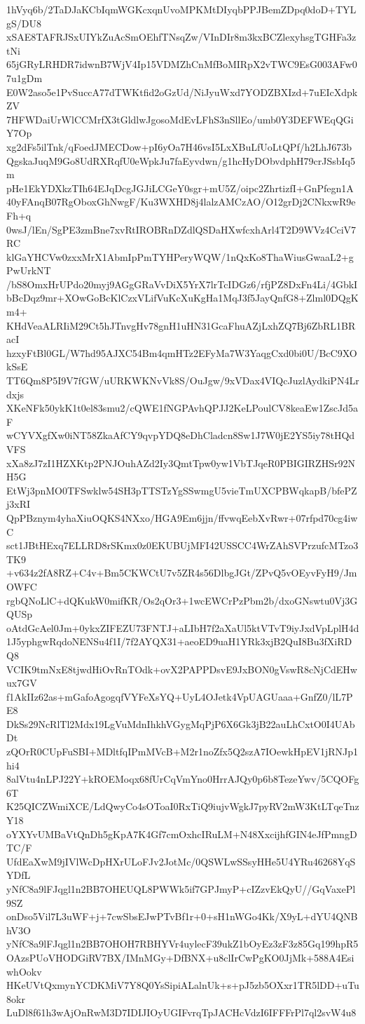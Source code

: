1hVyq6b/2TaDJaKCbIqmWGKcxqnUvoMPKMtDIyqbPPJBemZDpq0doD+TYLgS/DU8
xSAE8TAFRJSxUIYkZuAcSmOEhfTNsqZw/VInDIr8m3kxBCZlexyhsgTGHFa3ztNi
65jGRyLRHDR7idwnB7WjV4Ip15VDMZhCnMfBoMIRpX2vTWC9EsG003AFw07u1gDm
E0W2aso5e1PvSuccA77dTWKtfid2oGzUd/NiJyuWxd7YODZBXIzd+7uEIcXdpkZV
7HFWDaiUrWlCCMrfX3tGldlwJgosoMdEvLFhS3nSllEo/umb0Y3DEFWEqQGiY7Op
xg2dFs5ilTnk/qFoedJMECDow+pI6yOa7H46vsI5LxXBuLfUoLtQPf/h2LhJ673b
QgskaJuqM9Go8UdRXRqfU0eWpkJu7faEyvdwn/g1hcHyDObvdphH79crJSsbIq5m
pHe1EkYDXkzTIh64EJqDcgJGJiLCGeY0sgr+mU5Z/oipc2ZhrtizfI+GnPfegn1A
40yFAnqB07RgOboxGhNwgF/Ku3WXHD8j4lalzAMCzAO/O12grDj2CNkxwR9eFh+q
0wsJ/lEn/SgPE3zmBne7xvRtIROBRnDZdlQSDaHXwfcxhArl4T2D9WVz4CciV7RC
klGaYHCVw0zxxMrX1AbmIpPmTYHPeryWQW/1nQxKo8ThaWiusGwaaL2+gPwUrkNT
/bS8OmxHrUPdo20myj9AGgGRaVvDiX5YrX7lrTcIDGz6/rfjPZ8DxFn4Li/4GbkI
bBcDqz9mr+XOwGoBcKlCzxVLifVuKcXuKgHa1MqJ3f5JayQnfG8+Zlml0DQgKm4+
KHdVeaALRIiM29Ct5hJTnvgHv78gnH1uHN31GcaFhuAZjLxhZQ7Bj6ZbRL1BRacI
hzxyFtBl0GL/W7hd95AJXC54Bm4qmHTz2EFyMa7W3YaqgCxd0bi0U/BcC9XOkSsE
TT6Qm8P5I9V7fGW/uURKWKNvVk8S/OuJgw/9xVDax4VIQcJuzlAydkiPN4Lrdxjs
XKeNFk50ykK1t0el83smu2/cQWE1fNGPAvhQPJJ2KeLPoulCV8keaEw1ZscJd5aF
wCYVXgfXw0iNT58ZkaAfCY9qvpYDQ8eDhCladcn8Sw1J7W0jE2YS5iy78tHQdVFS
xXa8zJ7zI1HZXKtp2PNJOuhAZd2Iy3QmtTpw0yw1VbTJqeR0PBIGIRZHSr92NH5G
EtWj3pnMO0TFSwklw54SH3pTTSTzYgSSwmgU5vieTmUXCPBWqkapB/bfePZj3xRI
QpPBznym4yhaXiuOQKS4NXxo/HGA9Em6jjn/ffvwqEebXvRwr+07rfpd70cg4iwC
sct1JBtHExq7ELLRD8rSKmx0z0EKUBUjMFI42USSCC4WrZAhSVPrzufcMTzo3TK9
+v634z2fA8RZ+C4v+Bm5CKWCtU7v5ZR4s56DlbgJGt/ZPvQ5vOEyvFyH9/JmOWFC
rgbQNoLlC+dQKukW0mifKR/Os2qOr3+1wcEWCrPzPbm2b/dxoGNswtu0Vj3GQUSp
oAtdGcAel0Jm+0ykxZIFEZU73FNTJ+aLIbH7f2aXaUl5ktVTvT9iyJxdVpLplH4d
1J5yphgwRqdoNENSu4f1I/7f2AYQX31+aeoED9uaH1YRk3xjB2QuI8Bu3fXiRDQ8
VCIK9tmNxE8tjwdHiOvRnTOdk+ovX2PAPPDsvE9JxBON0gVswR8cNjCdEHwux7GV
f1AkIIz62as+mGafoAgogqfVYFeXsYQ+UyL4OJetk4VpUAGUaaa+GnfZ0/lL7PE8
DkSs29NcRlTl2Mdx19LgVuMdnIhkhVGygMqPjP6X6Gk3jB22auLhCxtO0I4UAbDt
zQOrR0CUpFuSBI+MDltfqIPmMVcB+M2r1noZfx5Q2szA7IOewkHpEV1jRNJp1hi4
8alVtu4nLPJ22Y+kROEMoqx68fUrCqVmYno0HrrAJQy0p6b8TezeYwv/5CQOFg6T
K25QICZWmiXCE/LdQwyCo4sOToaI0RxTiQ9iujvWgkJ7pyRV2mW3KtLTqeTnzY18
oYXYvUMBaVtQnDh5gKpA7K4Gf7cmOxhcIRuLM+N48XxcijhfGIN4eJfPmngDTC/F
UfdEaXwM9jIVlWcDpHXrULoFJv2JotMc/0QSWLwSSsyHHe5U4YRu46268YqSYDfL
yNfC8a9lFJqgl1n2BB7OHEUQL8PWWk5if7GPJmyP+cIZzvEkQyU//GqVaxePl9SZ
onDso5Vil7L3uWF+j+7cwSbsEJwPTvBf1r+0+sH1nWGo4Kk/X9yL+dYU4QNBhV3O
yNfC8a9lFJqgl1n2BB7OHOH7RBHYVr4uylecF39ukZ1bOyEz3zF3z85Gq199hpR5
OAzsPUoVHODGiRV7BX/IMnMGy+DfBNX+u8clIrCwPgKO0JjMk+588A4EsiwhOokv
HKeUVtQxmynYCDKMiV7Y8Q0YsSipiALalnUk+s+pJ5zb5OXxr1TR5lDD+uTu8okr
LuDl8f61h3wAjOnRwM3D7IDIJIOyUGIFvrqTpJACHcVdzI6IFFFrPl7ql2svW4u8
